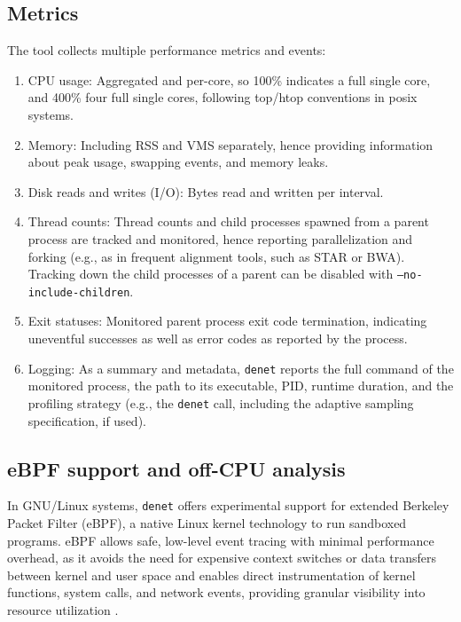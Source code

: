 \documentclass[10pt]{article}
\begin{document}
\subsection*{Metrics}

The tool collects multiple performance metrics and events:

\begin{enumerate}[itemsep=1pt, topsep=1pt]
    \item CPU usage: Aggregated and per-core, so 100\% indicates a full single core, and 400\% four full single cores, following top/htop conventions in posix systems.
    \item Memory: Including RSS and VMS separately, hence providing information about peak usage, swapping events, and memory leaks.
    \item Disk reads and writes (I/O): Bytes read and written per interval.
    \item Thread counts: Thread counts and child processes spawned from a parent process are tracked and monitored, hence reporting parallelization and forking (e.g., as in frequent alignment tools, such as STAR or BWA). Tracking down the child processes of a parent can be disabled with \texttt{--no-include-children}. 
    \item Exit statuses: Monitored parent process exit code termination, indicating uneventful successes as well as error codes as reported by the process.
    \item Logging: As a summary and metadata, \texttt{denet} reports the full command of the monitored process, the path to its executable, PID, runtime duration, and the profiling strategy (e.g., the \texttt{denet} call, including the adaptive sampling specification, if used).
\end{enumerate}

\subsection*{eBPF support and off-CPU analysis}

In GNU/Linux systems, \texttt{denet} offers experimental support for extended Berkeley Packet Filter (eBPF), a native Linux kernel technology to run sandboxed programs. eBPF allows safe, low-level event tracing with minimal performance overhead, as it avoids the need for expensive context switches or data transfers between kernel and user space and enables direct instrumentation of kernel functions, system calls, and network events, providing granular visibility into resource utilization \cite{gregg2019bpf,gbadamosi2024ebpf}. 
\end{document}

